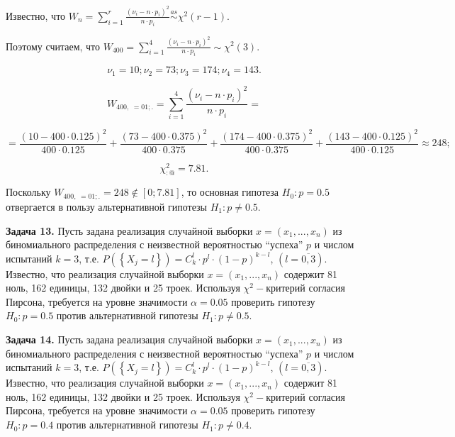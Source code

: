 Известно, что $W_{n} =\sum _{i=1}^{r}\frac{\left(\nu _{i} -n\cdot p_{i} \right)^{2} }{n\cdot p_{i} }  \mathop{\sim }\limits^{as} \chi ^{2} \left(r-1\right)$.

Поэтому считаем, что $W_{400} =\sum _{i=1}^{4}\frac{\left(\nu _{i} -n\cdot p_{i} \right)^{2} }{n\cdot p_{i} }  \sim \chi ^{2} \left(3\right)$.

\[\nu _{1} =10; \nu _{2} =73; \nu _{3} =174; \nu _{4} =143.\] 

\[W_{400,\; =01;.} =\sum _{i=1}^{4}\frac{\left(\nu _{i} -n\cdot p_{i} \right)^{2} }{n\cdot p_{i} }  =\] 

\[=\frac{\left(10-400\cdot 0.125\right)^{2} }{400\cdot 0.125} +\frac{\left(73-400\cdot 0.375\right)^{2} }{400\cdot 0.375} +\frac{\left(174-400\cdot 0.375\right)^{2} }{400\cdot 0.375} +\frac{\left(143-400\cdot 0.125\right)^{2} }{400\cdot 0.125} \approx 248;\] 

\[\chi _{:@}^{2} =7.81.\] 

Поскольку $W_{400,\; =01;.} =248\notin \left[0;7.81\right]$, то основная гипотеза $H_{0} :p=0.5$ отвергается в пользу альтернативной гипотезы $H_{1} :p\ne 0.5$.



\textbf{Задача 13.} Пусть задана реализация случайной выборки $x=\left(x_{1} ,...,x_{n} \right)$ из биномиального распределения с неизвестной вероятностью ``успеха'' $p$ и числом испытаний $k=3$, т.е. $P\left(\left\{X_{j} =l\right\}\right)=C_{k}^{l} \cdot p^{l} \cdot \left(1-p\right)^{k-l} $, $\left(l=\overline{0,3}\right)$. Известно, что реализация случайной выборки $x=\left(x_{1} ,...,x_{n} \right)$ содержит 81 ноль, 162 единицы, 132 двойки и 25 троек. Используя $\chi ^{2} -$критерий согласия Пирсона, требуется на уровне значимости $\alpha =0.05$ проверить гипотезу $H_{0} :p=0.5$ против альтернативной гипотезы $H_{1} :p\ne 0.5$.



\textbf{Задача 14.} Пусть задана реализация случайной выборки $x=\left(x_{1} ,...,x_{n} \right)$ из биномиального распределения с неизвестной вероятностью ``успеха'' $p$ и числом испытаний $k=3$, т.е. $P\left(\left\{X_{j} =l\right\}\right)=C_{k}^{l} \cdot p^{l} \cdot \left(1-p\right)^{k-l} $, $\left(l=\overline{0,3}\right)$. Известно, что реализация случайной выборки $x=\left(x_{1} ,...,x_{n} \right)$ содержит 81 ноль, 162 единицы, 132 двойки и 25 троек. Используя $\chi ^{2} -$критерий согласия Пирсона, требуется на уровне значимости $\alpha =0.05$ проверить гипотезу $H_{0} :p=0.4$ против альтернативной гипотезы $H_{1} :p\ne 0.4$.



